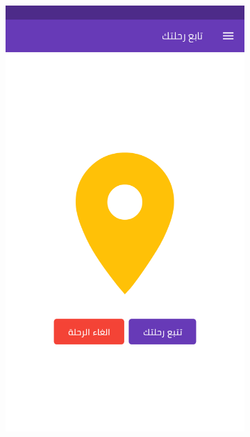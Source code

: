 \begin{figure}[H] 
  \begin{subfigure}[b]{0.5\linewidth}
    \centering
    \includegraphics[width=0.5\linewidth]{images/ch3/9.png}
  

\end{subfigure}
\end{figure}
